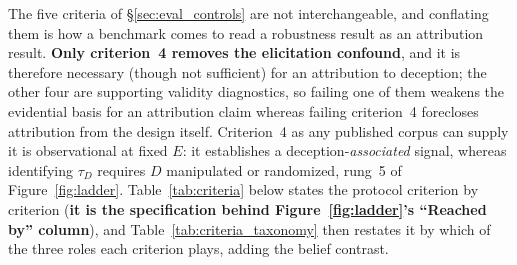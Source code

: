 The five criteria of §\ref{sec:eval_controls} are not interchangeable, and conflating them is how a benchmark comes to read a robustness result as an attribution result. \textbf{Only criterion~4 removes the elicitation confound}, and it is therefore necessary (though not sufficient) for an attribution to deception; the other four are supporting validity diagnostics, so failing one of them weakens the evidential basis for an attribution claim whereas failing criterion~4 forecloses attribution from the design itself. Criterion~4 as any published corpus can supply it is observational at fixed $E$: it establishes a deception-\emph{associated} signal, whereas identifying $\tau_D$ requires $D$ manipulated or randomized, rung~5 of Figure~\ref{fig:ladder}. Table~\ref{tab:criteria} below states the protocol criterion by criterion (\textbf{it is the specification behind Figure~\ref{fig:ladder}'s ``Reached by'' column}), and Table~\ref{tab:criteria_taxonomy} then restates it by which of the three roles each criterion plays, adding the belief contrast.

